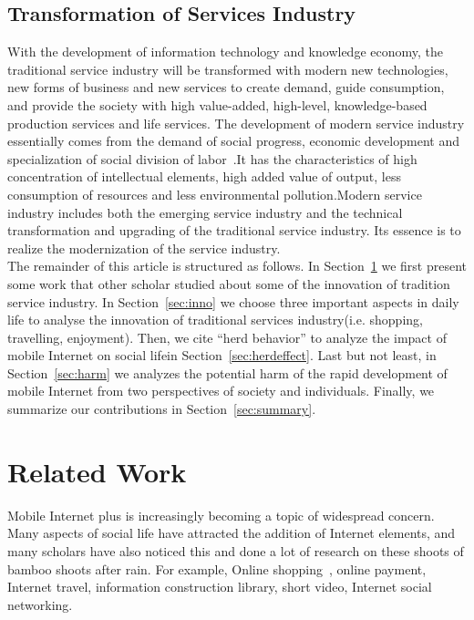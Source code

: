 \documentclass{elsarticle}
\begin{document}
\subsection{Transformation of Services Industry}
With the development of information technology and knowledge economy, the traditional service industry will be transformed with modern new technologies, new forms of business and new services to create demand, guide consumption, and provide the society with high value-added, high-level, knowledge-based production services and life services.
The development of modern service industry essentially comes from the demand of social progress, economic development and specialization of social division of labor~\cite{cx,cx4,cy}.It has the characteristics of high concentration of intellectual elements, high added value of output, less consumption of resources and less environmental pollution.Modern service industry includes both the emerging service industry and the technical transformation and upgrading of the traditional service industry. Its essence is to realize the modernization of the service industry.\\


The remainder of this article is structured as follows. In Section~\ref{sec:relatedwork} we first
present some work that other scholar studied about some of the innovation of tradition service industry. In Section~\ref{sec:inno} we choose three important aspects in daily life to analyse the innovation of traditional services industry(i.e. shopping, travelling, enjoyment). Then, we cite ``herd behavior'' to analyze the impact of mobile Internet on social lifein Section~\ref{sec:herdeffect}. Last but not least, in Section~\ref{sec:harm} we analyzes the potential harm of the rapid development of mobile Internet from two perspectives of society and individuals. Finally, we summarize our contributions
in Section~\ref{sec:summary}.

\section{Related Work}\label{sec:relatedwork}
Mobile Internet plus is increasingly becoming a topic of widespread concern. Many aspects of social life have attracted the addition of Internet elements, and many scholars have also noticed this and done a lot of research on these shoots of bamboo shoots after rain. For example, Online shopping~\cite{wg,wg7,wg8,wm2}, online payment\cite{wm,jr,jr2}, Internet travel\cite{che,che3,che4}, information construction library\cite{chm,tsg}, short video\cite{dsp,dsp3,dsp7}, Internet social networking\cite{hlw}. 
\end{document}
